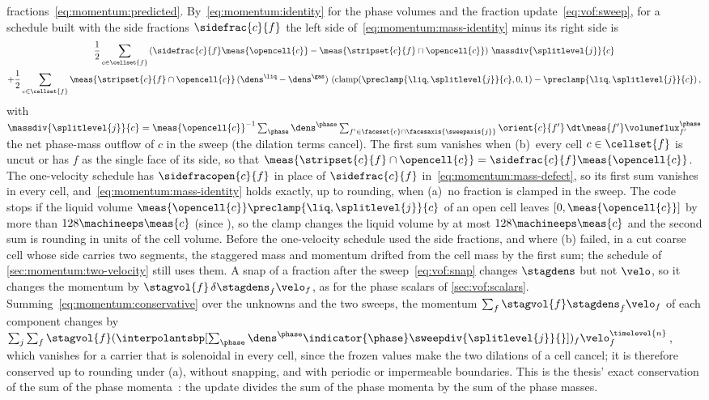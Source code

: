 fractions~\cref{eq:momentum:predicted}. By~\cref{eq:momentum:identity} for the
phase volumes and the fraction update~\cref{eq:vof:sweep}, for a schedule
built with the side fractions $\sidefrac{c}{f}$ the left side
of~\cref{eq:momentum:mass-identity} minus its right side is
\begin{multline}\label{eq:momentum:mass-defect}
  \half\sum_{c\in\cellset{f}}\roundpar{\sidefrac{c}{f}\meas{\opencell{c}}-\meas{\stripset{c}{f}\cap\opencell{c}}}\,\massdiv{\splitlevel{j}}{c}\\
  +\half\sum_{c\in\cellset{f}}\meas{\stripset{c}{f}\cap\opencell{c}}\,(\dens^{\liq}-\dens^{\gas})\,
    \roundpar{\operatorname{clamp}(\preclamp{\liq,\splitlevel{j}}{c},0,1)-\preclamp{\liq,\splitlevel{j}}{c}},
\end{multline}
with $\massdiv{\splitlevel{j}}{c}=\meas{\opencell{c}}^{-1}\sum_\phase\dens^{\phase}\sum_{f'\in\faceset{c}\cap\facesaxis{\sweepaxis{j}}}\orient{c}{f'}\,\dt\meas{f'}\volumeflux^{\phase}_{f'}$
the net phase-mass outflow of $c$ in the sweep (the dilation terms cancel).
The first sum vanishes when (b)~every cell $c\in\cellset{f}$ is uncut or has
$f$ as the single face of its side, so that
$\meas{\stripset{c}{f}\cap\opencell{c}}=\sidefrac{c}{f}\meas{\opencell{c}}$. The
one-velocity schedule has $\sidefracopen{c}{f}$ in place of $\sidefrac{c}{f}$
in~\cref{eq:momentum:mass-defect}, so its first sum vanishes in every cell,
and~\cref{eq:momentum:mass-identity} holds exactly, up to rounding, when
(a)~no fraction is clamped in the sweep. The code stops if the liquid volume
$\meas{\opencell{c}}\preclamp{\liq,\splitlevel{j}}{c}$ of an open cell leaves
$[0,\meas{\opencell{c}}]$ by more than $128\machineeps\meas{c}$ (since
), so the clamp changes the liquid volume by at most
$128\machineeps\meas{c}$ and the second sum is rounding in units of the cell
volume. Before  the one-velocity schedule used the side fractions,
and where (b) failed, in a cut coarse cell whose side carries two segments,
the staggered mass and momentum drifted from the cell mass by the first sum;
the schedule of \cref{sec:momentum:two-velocity} still uses them. A snap of a
fraction after the sweep~\cref{eq:vof:snap} changes $\stagdens$ but not
$\velo$, so it changes the momentum by $\stagvol{f}\,\delta\stagdens_f\velo_f$,
as for the phase scalars of \cref{sec:vof:scalars}.
Summing~\cref{eq:momentum:conservative} over the unknowns and the two
sweeps, the momentum $\sum_f\stagvol{f}\stagdens_f\velo_f$ of each component
changes by
$\sum_j\sum_f\stagvol{f}(\interpolantsbp[\sum_\phase\dens^\phase\indicator{\phase}\sweepdiv{\splitlevel{j}}{}])_f\velo^{\timelevel{n}}_f$,
which vanishes for a carrier that is solenoidal in every cell, since the
frozen values make the two dilations of a cell cancel; it is therefore
conserved up to rounding under (a), without snapping, and with periodic or
impermeable boundaries. This is the thesis' exact conservation of the sum of
the phase momenta~: the update divides the sum of the
phase momenta by the sum of the phase masses.

